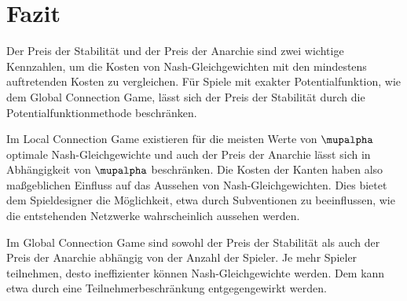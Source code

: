 \section{Fazit}

Der Preis der Stabilität und der Preis der Anarchie
sind zwei wichtige Kennzahlen,
um die Kosten von Nash-Gleichgewichten
mit den mindestens auftretenden Kosten zu vergleichen.
Für Spiele mit exakter Potentialfunktion, wie dem Global Connection Game,
lässt sich der Preis der Stabilität
durch die Potentialfunktionmethode beschränken.

Im Local Connection Game existieren für die meisten Werte von $\mupalpha$
optimale Nash-Gleichgewichte
und auch der Preis der Anarchie lässt sich
in Abhängigkeit von $\mupalpha$ beschränken.
Die Kosten der Kanten haben also
maßgeblichen Einfluss auf das Aussehen von Nash-Gleichgewichten.
Dies bietet dem Spieldesigner die Möglichkeit,
etwa durch Subventionen zu beeinflussen,
wie die entstehenden Netzwerke wahrscheinlich aussehen werden.

Im Global Connection Game sind
sowohl der Preis der Stabilität als auch der Preis der Anarchie
abhängig von der Anzahl der Spieler.
Je mehr Spieler teilnehmen,
desto ineffizienter können Nash-Gleichgewichte werden.
Dem kann etwa durch eine Teilnehmerbeschränkung entgegengewirkt werden.
